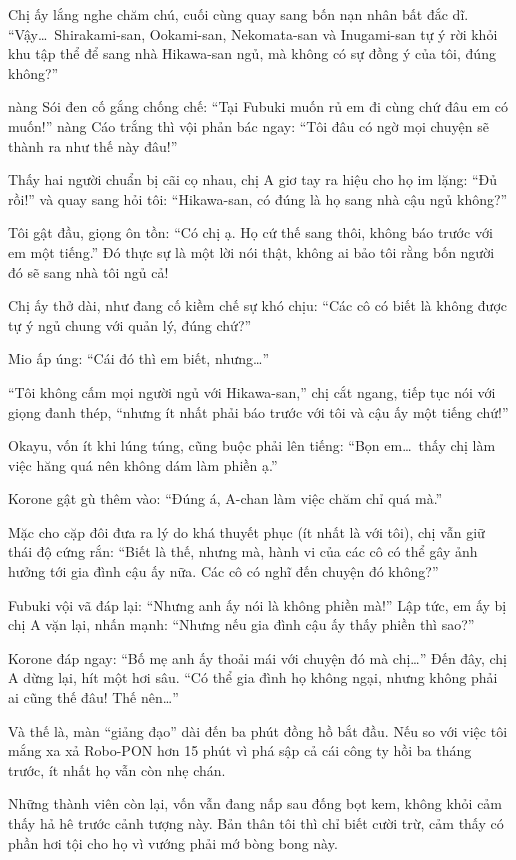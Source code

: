 \documentclass[../main.tex]{subfiles}
\begin{document}
Chị ấy lắng nghe chăm chú, cuối cùng quay sang bốn nạn nhân bất đắc dĩ. ``Vậy\dots\ Shirakami-san, Ookami-san, Nekomata-san và Inugami-san tự ý rời khỏi khu tập thể để sang nhà Hikawa-san ngủ, mà không có sự đồng ý của tôi, đúng không?''

nàng Sói đen cố gắng chống chế: ``Tại Fubuki muốn rủ em đi cùng chứ đâu em có muốn!'' nàng Cáo trắng thì vội phản bác ngay: ``Tôi đâu có ngờ mọi chuyện sẽ thành ra như thế này đâu!''

Thấy hai người chuẩn bị cãi cọ nhau, chị A giơ tay ra hiệu cho họ im lặng: ``Đủ rồi!'' và quay sang hỏi tôi: ``Hikawa-san, có đúng là họ sang nhà cậu ngủ không?''

Tôi gật đầu, giọng ôn tồn: ``Có chị ạ. Họ cứ thế sang thôi, không báo trước với em một tiếng.'' Đó thực sự là một lời nói thật, không ai bảo tôi rằng bốn người đó sẽ sang nhà tôi ngủ cả!

Chị ấy thở dài, như đang cố kiềm chế sự khó chịu: ``Các cô có biết là không được tự ý ngủ chung với quản lý, đúng chứ?''

Mio ấp úng: ``Cái đó thì em biết, nhưng\dots''

``Tôi không cấm mọi người ngủ với Hikawa-san,'' chị cắt ngang, tiếp tục nói với giọng đanh thép, ``nhưng ít nhất phải báo trước với tôi và cậu ấy một tiếng chứ!''

Okayu, vốn ít khi lúng túng, cũng buộc phải lên tiếng: ``Bọn em\dots\ thấy chị làm việc hăng quá nên không dám làm phiền ạ.''

Korone gật gù thêm vào: ``Đúng á, A-chan làm việc chăm chỉ quá mà.''

Mặc cho cặp đôi đưa ra lý do khá thuyết phục (ít nhất là với tôi), chị vẫn giữ thái độ cứng rắn: ``Biết là thế, nhưng mà, hành vi của các cô có thể gây ảnh hưởng tới gia đình cậu ấy nữa. Các cô có nghĩ đến chuyện đó không?''

Fubuki vội vã đáp lại: ``Nhưng anh ấy nói là không phiền mà!'' Lập tức, em ấy bị chị A vặn lại, nhấn mạnh: ``Nhưng nếu gia đình cậu ấy thấy phiền thì sao?''

Korone đáp ngay: ``Bố mẹ anh ấy thoải mái với chuyện đó mà chị\dots'' Đến đây, chị A dừng lại, hít một hơi sâu. ``Có thể gia đình họ không ngại, nhưng không phải ai cũng thế đâu! Thế nên\dots''

Và thế là, màn ``giảng đạo'' dài đến ba phút đồng hồ bắt đầu. Nếu so với việc tôi mắng xa xả Robo-PON hơn 15 phút vì phá sập cả cái công ty hồi ba tháng trước, ít nhất họ vẫn còn nhẹ chán.

Những thành viên còn lại, vốn vẫn đang nấp sau đống bọt kem, không khỏi cảm thấy hả hê trước cảnh tượng này. Bản thân tôi thì chỉ biết cười trừ, cảm thấy có phần hơi tội cho họ vì vướng phải mớ bòng bong này.
\end{document}
